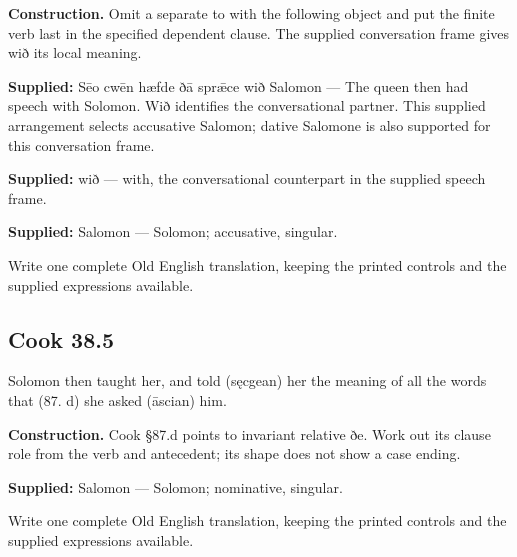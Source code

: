\textbf{Construction.} Omit a separate to with the following object and put the finite verb last in the specified dependent clause. The supplied conversation frame gives wið its local meaning.

\textbf{Supplied:} Sēo cwēn hæfde ðā sprǣce wið Salomon — The queen then had speech with Solomon. Wið identifies the conversational partner. This supplied arrangement selects accusative Salomon; dative Salomone is also supported for this conversation frame.

\textbf{Supplied:} wið — with, the conversational counterpart in the supplied speech frame.

\textbf{Supplied:} Salomon — Solomon; accusative, singular.

Write one complete Old English translation, keeping the printed controls and the supplied expressions available.

\par\begin{minipage}{\linewidth}\raggedright
\subsection*{Cook 38.5}

Solomon then taught her, and told (sęcgean) her the meaning of all the words that (87. d) she asked (āscian) him.

\textbf{Construction.} Cook §87.d points to invariant relative ðe. Work out its clause role from the verb and antecedent; its shape does not show a case ending.

\end{minipage}\par\addvspace{4pt}

\textbf{Supplied:} Salomon — Solomon; nominative, singular.

Write one complete Old English translation, keeping the printed controls and the supplied expressions available.

